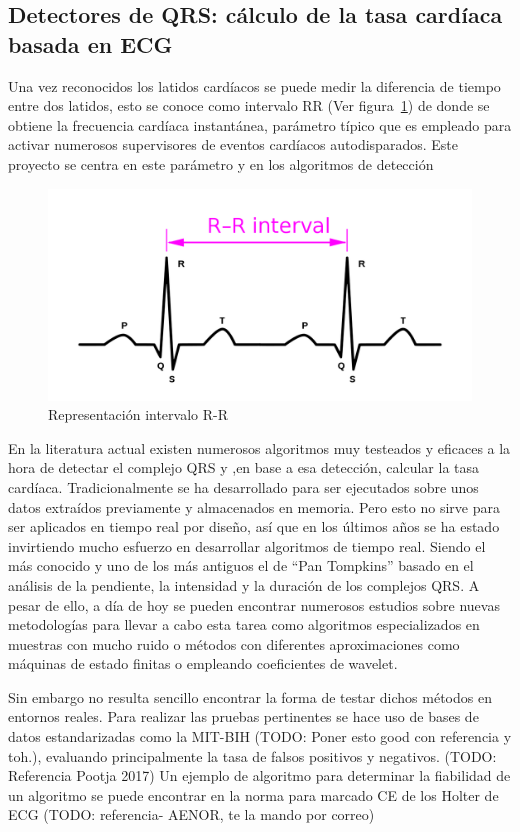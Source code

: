 \subsection{Detectores de QRS: cálculo de la tasa cardíaca basada en ECG}

Una vez reconocidos los latidos cardíacos se puede medir la diferencia de tiempo entre dos latidos, esto se conoce como intervalo RR (Ver figura~\ref{fig:RRInterval})  de donde se obtiene la frecuencia cardíaca instantánea, parámetro típico que es empleado para activar numerosos supervisores de eventos cardíacos autodisparados. Este proyecto se centra en este parámetro y en los algoritmos de detección  

\begin{figure}[ht]
	\centering
		\includegraphics[width=0.6\linewidth]{figuras/RRInterval.png}
	\caption{Representación intervalo R-R}
	\label{fig:RRInterval}
\end{figure} 

\clearpage
En la literatura actual existen numerosos algoritmos muy testeados y eficaces a la hora de detectar el complejo QRS y ,en base a esa detección, calcular la tasa cardíaca. Tradicionalmente se ha desarrollado para ser ejecutados sobre unos datos extraídos previamente y almacenados en memoria. Pero esto no sirve para ser aplicados en tiempo real por diseño, así que en los últimos años se ha estado invirtiendo mucho esfuerzo en desarrollar algoritmos de tiempo real. Siendo el más conocido y uno de los más antiguos el de “Pan Tompkins” basado en el análisis de la pendiente, la intensidad y la duración de los complejos QRS.\cite{PanTompkins} A pesar de ello, a día de hoy se pueden encontrar numerosos estudios sobre nuevas metodologías para llevar a cabo esta tarea como algoritmos especializados en muestras con mucho ruido\cite{RsSlope} o métodos con diferentes aproximaciones como máquinas de estado finitas\cite{FSM} o empleando coeficientes de wavelet.\cite{Wavelet}

Sin embargo no resulta sencillo encontrar la forma de testar dichos métodos en entornos reales. Para realizar las pruebas pertinentes se hace uso de bases de datos estandarizadas como la MIT-BIH (TODO: Poner esto good con referencia y toh.), evaluando principalmente la tasa de falsos positivos y negativos. (TODO: Referencia Pootja 2017) Un ejemplo de algoritmo para determinar la fiabilidad de un algoritmo se puede encontrar en la norma para marcado CE de los Holter de ECG (TODO: referencia- AENOR, te la mando por correo)

